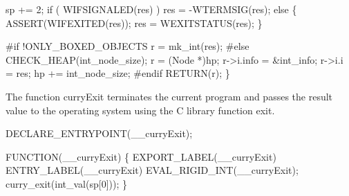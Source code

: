     sp += 2;
    if ( WIFSIGNALED(res) )
        res = -WTERMSIG(res);
    else
    \{
        ASSERT(WIFEXITED(res));
        res = WEXITSTATUS(res);
    \}

#if !ONLY_BOXED_OBJECTS
    r = mk_int(res);
#else
    CHECK_HEAP(int_node_size);
    r         = (Node *)hp;
    r->i.info = &int_info;
    r->i.i    = res;
    hp       += int_node_size;
#endif
    RETURN(r);
\}

\nwendcode{}\nwdocspar
The function {\Tt{}curryExit\nwendquote} terminates the current program and passes
the result value to the operating system using the C library function
{\Tt{}exit\nwendquote}.

\nwenddocs{}\plusendmoddef\nwstartdeflinemarkup{}\nwenddeflinemarkup
DECLARE_ENTRYPOINT(__curryExit);

FUNCTION(__curryExit)
\{
    EXPORT_LABEL(__curryExit)
 ENTRY_LABEL(__curryExit)
    EVAL_RIGID_INT(__curryExit);
    curry_exit(int_val(sp[0]));
\}
\nwendcode{}

%

